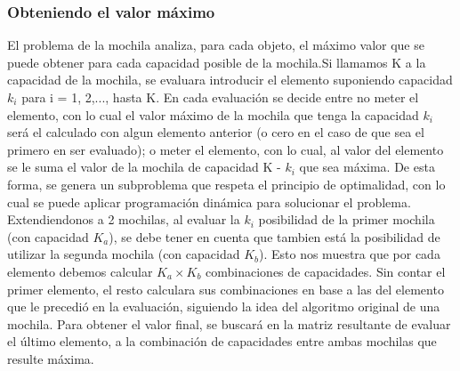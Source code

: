 


\subsubsection*{Obteniendo el valor máximo}
 El problema de la mochila analiza, para cada objeto, el máximo valor que se puede obtener para cada capacidad posible de la mochila.Si llamamos K a la capacidad de la mochila, se evaluara introducir   el elemento suponiendo capacidad $k_{i}$ para i = 1, 2,..., hasta K. En cada evaluación se decide entre no meter el elemento, con lo cual el valor máximo de la mochila que tenga la capacidad $k_{i}$ será el calculado con algun elemento anterior (o cero en el caso de que sea el primero en ser evaluado); o meter el elemento, con lo cual, al valor del elemento se le suma el valor de la mochila de capacidad K - $k_{i}$ que sea máxima. De esta forma, se genera un subproblema que respeta el principio de optimalidad, con lo cual se puede aplicar programación dinámica para solucionar el problema. \\
 
  Extendiendonos a 2 mochilas, al evaluar la $k_{i}$ posibilidad de la primer mochila (con capacidad $K_{a}$), se debe tener en cuenta que tambien está la posibilidad de utilizar la segunda mochila (con capacidad $K_{b}$). Esto nos muestra que por cada elemento debemos calcular $K_{a} \times K_{b}$ combinaciones de capacidades. Sin contar el primer elemento, el resto calculara sus combinaciones en base a las del elemento que le precedió en la evaluación, siguiendo la idea del algoritmo original de una mochila. Para obtener el valor final, se buscará en la matriz resultante de evaluar el último elemento, a la combinación de capacidades entre ambas mochilas que resulte máxima.\\
  
